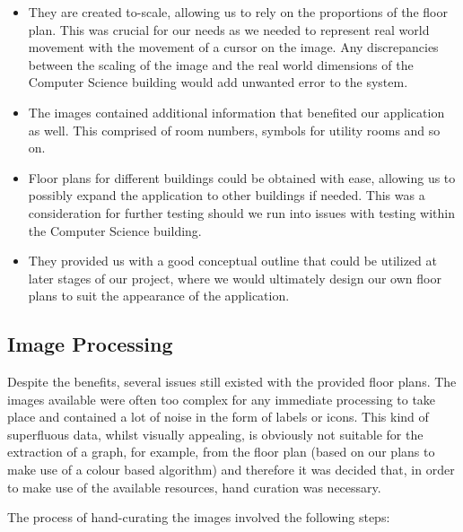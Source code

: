 \documentclass[12pt,a4paper]{report}
\begin{document}
\begin{itemize}

\item They are created to-scale, allowing us to rely on the proportions of the floor plan. This was crucial for our needs as we needed to represent real world movement with the movement of a cursor on the image. Any discrepancies between the scaling of the image and the real world dimensions of the Computer Science building would add unwanted error to the system.

\item The images contained additional information that benefited our application as well. This comprised of room numbers, symbols for utility rooms and so on.

\item Floor plans for different buildings could be obtained with ease, allowing us to possibly expand the application to other buildings if needed. This was a consideration for further testing should we run into issues with testing within the Computer Science building.

\item They provided us with a good conceptual outline that could be utilized at later stages of our project, where we would ultimately design our own floor plans to suit the appearance of the application.
\end{itemize}
		
\subsection{Image Processing}

Despite the benefits, several issues still existed with the provided floor plans. The images available were often too complex for any immediate processing to take place and contained a lot of noise in the form of labels or icons. This kind of superfluous data, whilst visually appealing, is obviously not suitable for the extraction of a graph, for example, from the floor plan (based on our plans to make use of a colour based algorithm) and therefore it was decided that, in order to make use of the available resources, hand curation was necessary.

The process of hand-curating the images involved the following steps:
\end{document}
